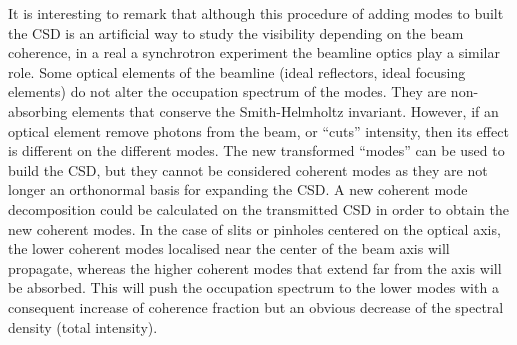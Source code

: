 \documentclass[%
 reprint,
 amsmath,amssymb,
 aps,
]{revtex4-1}
\begin{document}
It is interesting to remark that although this procedure of adding modes to built the CSD is an artificial way to study the visibility depending on the beam coherence, in a real a synchrotron experiment the beamline optics play a similar role. Some optical elements of the beamline (ideal reflectors, ideal focusing elements) do not alter the occupation spectrum of the modes. They are non-absorbing elements that conserve the Smith-Helmholtz invariant. However, if an optical element remove photons from the beam, or ``cuts'' intensity, then its effect is different on the different modes. The new transformed ``modes'' can be used to build the CSD, but they cannot be considered coherent modes as they are not longer an orthonormal basis for expanding the CSD. A new coherent mode decomposition could be calculated on the transmitted CSD in order to obtain the new coherent modes. In the case of slits or pinholes centered on the optical axis, the lower coherent modes localised near the center of the beam axis will propagate, whereas the higher coherent modes that extend far from the axis will be absorbed. This will push the occupation spectrum to the lower modes with a consequent increase of coherence fraction but an obvious decrease of the spectral density (total intensity).     
\end{document}
